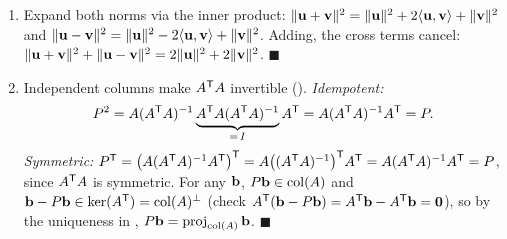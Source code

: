 \begin{enumerate}[label=\textbf{5.\arabic*},leftmargin=2.6em,itemsep=8pt]
\item Expand both norms via the inner product: $\norm{\vu+\vv}^2=\norm{\vu}^2+2\inner{\vu}{\vv}+\norm{\vv}^2$ and $\norm{\vu-\vv}^2=\norm{\vu}^2-2\inner{\vu}{\vv}+\norm{\vv}^2$. Adding, the cross terms cancel: $\norm{\vu+\vv}^2+\norm{\vu-\vv}^2=2\norm{\vu}^2+2\norm{\vv}^2$. $\blacksquare$

\item Independent columns make $A\trans A$ invertible (). \emph{Idempotent:}
\[
P^2=A(A\trans A)\inv \underbrace{A\trans A(A\trans A)\inv}_{=\,I} A\trans=A(A\trans A)\inv A\trans=P.
\]
\emph{Symmetric:} $P\trans=\bigl(A(A\trans A)\inv A\trans\bigr)\trans=A\bigl((A\trans A)\inv\bigr)\trans A\trans=A(A\trans A)\inv A\trans=P$, since $A\trans A$ is symmetric. For any $\vb$, $P\vb\in\colsp(A)$ and $\vb-P\vb\in\ker(A\trans)=\colsp(A)^\perp$ (check $A\trans(\vb-P\vb)=A\trans\vb-A\trans\vb=\vze$), so by the uniqueness in , $P\vb=\proj_{\colsp(A)}\vb$. $\blacksquare$

\end{enumerate}
